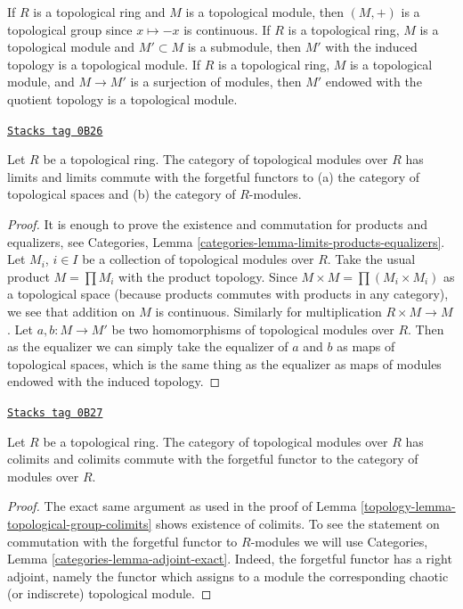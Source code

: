 If $R$ is a topological ring and $M$ is a topological module, then
$(M, +)$ is a topological group since $x \mapsto -x$ is continuous.
If $R$ is a topological ring, $M$ is a topological module and
$M' \subset M$ is a submodule, then $M'$ with the induced topology
is a topological module. If $R$ is a topological ring, $M$
is a topological module, and $M \to M'$ is a surjection of
modules, then $M'$ endowed with the quotient topology is a topological
module.

\begin{lemma}
\label{topology-lemma-topological-module-limits}
\href{https://stacks.math.columbia.edu/tag/0B26}{\texttt{Stacks tag 0B26}}

Let $R$ be a topological ring. The category of topological modules over $R$
has limits and limits commute with the forgetful functors to
(a) the category of topological spaces and
(b) the category of $R$-modules.
\end{lemma}

\begin{proof}
It is enough to prove the existence and commutation for products and
equalizers, see
Categories, Lemma \ref{categories-lemma-limits-products-equalizers}.
Let $M_i$, $i \in I$ be a collection of topological modules over $R$.
Take the usual product $M = \prod M_i$ with the product topology.
Since $M \times M = \prod (M_i \times M_i)$ as a topological space
(because products commutes with products in any category), we
see that addition on $M$ is continuous. Similarly for multiplication
$R \times M \to M$.
Let $a, b : M \to M'$ be two homomorphisms of topological modules over $R$.
Then as the equalizer we can simply take the equalizer of $a$ and $b$
as maps of topological spaces, which is the same thing as the equalizer
as maps of modules endowed with the induced topology.
\end{proof}

\begin{lemma}
\label{topology-lemma-topological-module-colimits}
\href{https://stacks.math.columbia.edu/tag/0B27}{\texttt{Stacks tag 0B27}}

Let $R$ be a topological ring. The category of topological modules over $R$
has colimits and colimits commute with the forgetful functor to the category
of modules over $R$.
\end{lemma}

\begin{proof}

The exact same argument as used in the proof of
Lemma \ref{topology-lemma-topological-group-colimits} shows existence of colimits.
To see the statement on commutation with the forgetful functor to
$R$-modules we will use Categories, Lemma \ref{categories-lemma-adjoint-exact}.
Indeed, the forgetful functor has a right adjoint, namely the functor which
assigns to a module the corresponding chaotic (or indiscrete) topological
module.
\end{proof}



